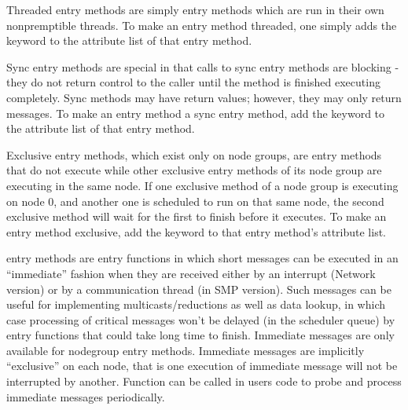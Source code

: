 Threaded entry methods are simply entry
methods which are run in their own nonpremptible threads.  To make an
entry method threaded, one simply adds the keyword
 to the attribute list of that entry method.

Sync entry methods are special in that calls to
sync entry methods are blocking - they do not return control to the caller
until the method is finished executing completely.  Sync methods may have
return values; however, they may only return messages.  To make an entry method a sync entry method, add the keyword  to the
attribute list of that entry method.

Exclusive entry methods, which exist only on node groups, are
entry methods that do not execute while other exclusive
entry methods of its node group are executing in the same
node.  If one exclusive method of a node group is executing on node 0, and
another one is scheduled to run on that same node, the second exclusive method
will wait for the first to finish before it executes.  To make an entry method exclusive, add the keyword  to that
entry method's attribute list.

 entry methods are entry functions in which 
short messages can be executed in an ``immediate'' fashion when they are 
received either by an interrupt (Network version) or by a communication 
thread (in SMP version). Such messages can be useful for 
implementing multicasts/reductions as well as data lookup, in which case 
processing of critical messages won't be delayed (in the scheduler queue) 
by entry functions that could take long time to finish. 
Immediate messages are only available for nodegroup entry methods.
Immediate messages are implicitly ``exclusive'' on each node, that is 
one execution of immediate message will not be interrupted by another.
Function  can be called in users code to 
probe and process immediate messages periodically.




